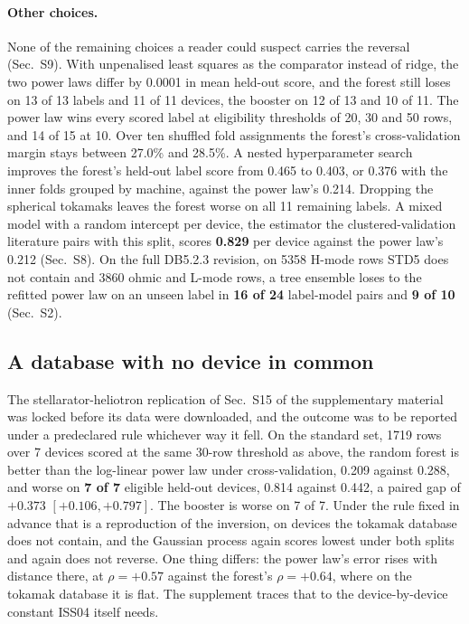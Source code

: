 \documentclass[aip,pop,preprint,amsmath,amssymb]{revtex4-2}
\begin{document}
\paragraph{Other choices.} None of the remaining choices a reader could suspect
carries the reversal (Sec.~S9). With unpenalised least squares as the
comparator instead of ridge, the two power laws differ by 0.0001 in mean
held-out score, and the forest still loses on 13 of 13 labels and 11 of 11
devices, the booster on 12 of 13 and 10 of 11. The power law
wins every scored label at
eligibility thresholds of 20, 30 and 50 rows, and 14 of 15 at 10. Over ten
shuffled fold assignments the forest's cross-validation margin stays between
27.0\% and 28.5\%. A nested hyperparameter search improves the forest's
held-out label score from 0.465 to 0.403, or 0.376 with the inner folds grouped
by machine, against the power law's 0.214. Dropping the spherical tokamaks
leaves the forest worse on all 11 remaining labels. A mixed model with a
random intercept per device, the estimator the clustered-validation literature
pairs with this split, scores \textbf{0.829} per device against the power law's
0.212 (Sec.~S8). On the full DB5.2.3 revision, on 5358 H-mode rows STD5 does
not contain and 3860 ohmic and L-mode rows, a tree ensemble loses to the
refitted power law on an unseen label in \textbf{16 of 24} label-model pairs
and \textbf{9 of 10} (Sec.~S2).

\subsection{A database with no device in common}
\label{sec:ishcdb}

The stellarator-heliotron replication of Sec.~S15 of the supplementary
material was locked before its data were downloaded, and the outcome was to be
reported under a predeclared rule whichever way it fell. On the standard set,
1719 rows over 7 devices scored at the same 30-row threshold as above, the
random forest is better than the log-linear power law under cross-validation,
0.209 against 0.288, and worse on \textbf{7 of 7} eligible held-out devices,
0.814 against 0.442, a paired gap of $+0.373$ $[+0.106, +0.797]$. The booster is
worse on 7 of 7. Under the rule fixed in advance that is a reproduction of the
inversion, on devices the tokamak database does not contain, and the Gaussian
process again scores lowest under both splits and again does not reverse. One thing differs: the power
law's error rises with distance there, at $\rho=+0.57$ against the forest's
$\rho=+0.64$, where on the tokamak database it is flat. The supplement traces that to the
device-by-device constant ISS04 itself needs.
\end{document}
